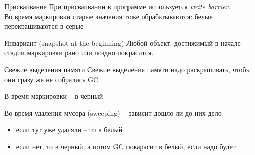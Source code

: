 \documentclass[aspectratio=169
  , xcolor={svgnames} 
  , hyperref={ colorlinks,citecolor=DeepPink4
             , linkcolor=DarkRed,urlcolor=DarkBlue}
  , russian
  ]{beamer}
\theoremstyle{exerciseStyle1}
\begin{document}
\begin{frame}{Присваивание}
При присваивании в программе используется \textit{ write barrier}. \\

Во время маркировки старые значения тоже обрабатываются: белые перекрашиваются в серые

\begin{block}{Инвариант (snapshot-at-the-beginning)}
Любой объект, достижимый в начале стадии маркировки рано или поздно покрасится.
\end{block}

\end{frame}

\begin{frame}{Свежие выделения памяти}
Свежие выделения памяти надо раскрашивать, чтобы они сразу же не собрались GC\vspace{1cm}

В время маркировки -- в черный\vspace{1cm}

Во время удаления мусора (sweeping) -- зависит дошло ли до них дело
\begin{itemize}
\item если тут уже удаляли -- то в белый 
\item если нет, то в черный, а потом GC покарасит в белый, если надо будет
\end{itemize}
\end{frame}
\end{document}
